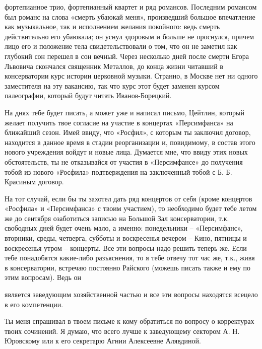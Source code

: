 
\noindent
фортепианное трио, фортепианный квартет и ряд романсов. Последним романсом был
романс на слова «смерть убаюкай меня», произведший большое впечатление как
музыкальное, так и исполнением желания покойного: ведь смерть действительно его
убаюкала; он уснул здоровым и больше не проснулся, причем лицо его и положение
тела свидетельствовали о том, что он не заметил как глубокий сон перешел в сон
вечный. Через несколько дней после смерти Егора Львовича скончался священник
Металлов, до конца жизни читавший в консерватории курс истории церковной
музыки. Странно, в Москве нет ни одного заместителя на эту вакансию, так что
курс этот будет заменен курсом палеографии, который будут читать
Иванов-Борецкий.


На днях тебе будет писать, а может уже и написал письмо, Цейтлин, который
желает получить твое согласие на участие в концертах «Персимфанса» на ближайший
сезон. Имей ввиду, что «Росфил», с которым ты заключил договор, находится в
данное время в стадии реорганизации и, повидимому, в состав этого нового
учреждения войдут и новые лица. Думается мне, что ввиду этих новых
обстоятельств, ты не отказывайся от участия в «Персимфансе» до получения тобой
из нового «Росфила» подтверждения на заключенный тобой с Б. Б. Красиным договор.


На тот случай, если бы ты захотел дать ряд концертов от себя (кроме концертов
«Росфила» и «Персимфанса» с твоим участием), то необходимо будет тебе летом же
до сентября озаботиться записью на Большой Зал консерватории, т.к. свободных
дней будет очень мало, а именно: понедельники -- «Персимфанс», вторники, среды,
четверга, субботы и воскресенья вечером -- Кино, пятницы и воскресенья утром --
концерты. Все эти вопросы надо решить теперь же. Если тебе понадобятся
какие-либо разъяснения, то я тебе отвечу тот час же, т.к., живя в
консерватории, встречаю постоянно Райского (можешь писать также и ему по этим
вопросам). Ведь он


\noindent
является заведующим хозяйственной частью и все эти вопросы находятся всецело в
его компетенции.

Ты меня спрашивал в твоем письме к кому обратиться по вопросу о корректурах
твоих сочинений. Я думаю, что всего лучше к заведующему сектором А. Н. Юровскому
или к его секретарю Агнии Алексеевне Алявдиной.

